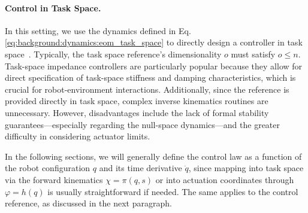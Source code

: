 \paragraph{Control in Task Space.}
In this setting, we use the dynamics defined in Eq.\ref{eq:background:dynamics:eom_task_space} to directly design a controller in task space~\citep{khatib1987unified}. Typically, the task space reference’s dimensionality $o$ must satisfy $o \leq n$. Task-space impedance controllers are particularly popular because they allow for direct specification of task-space stiffness and damping characteristics, which is crucial for robot-environment interactions. Additionally, since the reference is provided directly in task space, complex inverse kinematics routines are unnecessary. However, disadvantages include the lack of formal stability guarantees—especially regarding the null-space dynamics—and the greater difficulty in considering actuator limits.

In the following sections, we will generally define the control law as a function of the robot configuration $q$ and its time derivative $\dot{q}$, since mapping into task space via the forward kinematics $\chi = \pi(q,s)$ or into actuation coordinates through $\varphi = h(q)$ is usually straightforward if needed. The same applies to the control reference, as discussed in the next paragraph.

